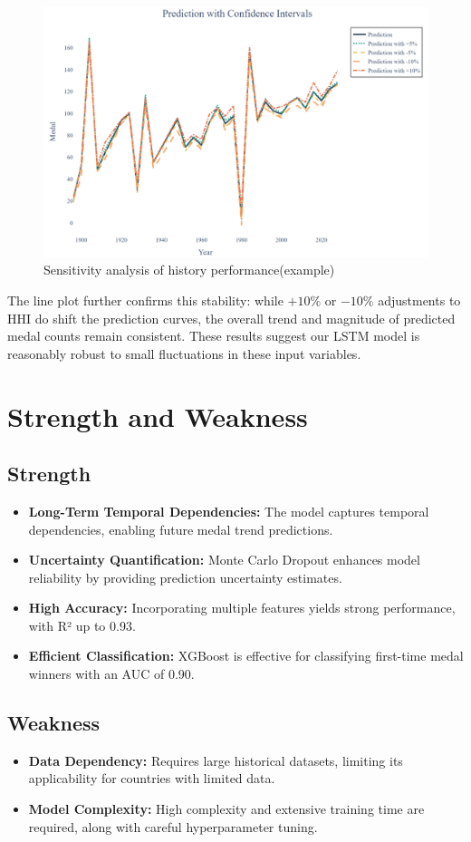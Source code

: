 \documentclass{mcmthesis}
\begin{document}
	\begin{figure}[H]
	\centering
	\includegraphics[width=0.8\linewidth]{fig/lineplot.png}
	\caption{Sensitivity analysis of history performance(example)}
	\label{lineplot}
\end{figure}
The line plot further confirms this stability: while $+10\%$ or $-10\%$ adjustments to HHI do shift the prediction curves, the overall trend and magnitude of predicted medal counts remain consistent. These results suggest our LSTM model is reasonably robust to small fluctuations in these input variables.
	
\section{Strength and Weakness}


\subsection{Strength}
\begin{itemize}[itemsep=1pt, parsep=2pt, topsep=0pt] %
	\item \textbf{Long-Term Temporal Dependencies:} The model captures temporal dependencies, enabling future medal trend predictions.
	\item \textbf{Uncertainty Quantification:} Monte Carlo Dropout enhances model reliability by providing prediction uncertainty estimates.
	\item \textbf{High Accuracy:} Incorporating multiple features yields strong performance, with R² up to 0.93.
	\item \textbf{Efficient Classification:} XGBoost is effective for classifying first-time medal winners with an AUC of 0.90.
\end{itemize}

\subsection{Weakness}
\begin{itemize}[itemsep=1pt, parsep=2pt, topsep=0pt] %
	\item \textbf{Data Dependency:} Requires large historical datasets, limiting its applicability for countries with limited data.
	\item \textbf{Model Complexity:} High complexity and extensive training time are required, along with careful hyperparameter tuning.
\end{itemize}
\end{document}
